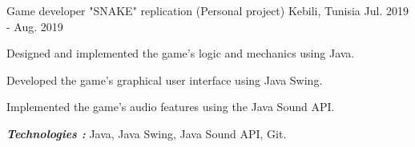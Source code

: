 \begin{cventries}
  \cventry
    {Game developer} %
    {"SNAKE" replication (Personal project)} %
    {Kebili, Tunisia} %
    {Jul. 2019 - Aug. 2019} %
    {
      \begin{cvitems} %
        \item {Designed and implemented the game's logic and mechanics using Java.}
        \item {Developed the game's graphical user interface using Java Swing.}
        \item {Implemented the game's audio features using the Java Sound API.}
       \end{cvitems}
       \vspace{5mm}
      \textbf{\textit{Technologies :}} Java, Java Swing, Java Sound API, Git.
      \vspace{5mm}
    }


\end{cventries}
